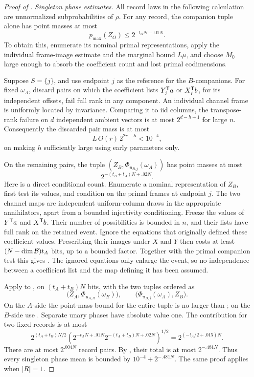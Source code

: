 \begin{proof}[Proof of ]
\medskip\noindent
\emph{Singleton phase estimates.}
All record laws in the following calculation are unnormalized
subprobabilities of \(\rho\).  For any record, the companion
tuple alone has point masses at most
\begin{equation}
 p_{\max}(Z_O)\le2^{-t_ON+.01N}.
 \label{eq:companion-pmax}
\end{equation}
To obtain this, enumerate its nominal primal representations,
apply the individual frame-image estimate and the marginal
bound \(L\mu\), and choose \(M_0\) large enough to absorb the
coefficient count and lost primal codimensions.

Suppose \(S=\{j\}\), and use endpoint \(j\) as the reference
for the \(B\)-companions.  For fixed \(\omega_A\), discard
pairs on which the coefficient lists
\(Y_j^{\mathsf T} a\) or \(X_j^{\mathsf T} b\), for its independent offsets,
fail full rank in any component.  An individual channel frame
is uniformly located by invariance.  Comparing it to iid
columns, the transpose-rank failure on \(d\) independent
ambient vectors is at most \(2^{d-h+1}\) for large \(n\).
Consequently the discarded pair mass is at most
\[
 L\,O(r)\,2^{2r-h}<10^{-4},
\]
on making \(h\) sufficiently large using early parameters only.

On the remaining pairs, the tuple
\((Z_B,\Phi_{u_{B,j}}(\omega_A))\) has point masses at most
\begin{equation}
 2^{-(t_B+t_A)N+.02N}.
 \label{eq:singleton-joint-pmax}
\end{equation}
Here is a direct conditional count.  Enumerate a nominal
representation of \(Z_B\), first test its values, and condition
on the primal frames at endpoint \(j\).  The two channel maps
are independent uniform-column draws in the appropriate
annihilators, apart from a bounded injectivity conditioning.
Freeze the values of \(Y^{\mathsf T} a\) and \(X^{\mathsf T} b\).  Their
number of possibilities is bounded in \(n\), and their lists
have full rank on the retained event.  Ignore the equations
that originally defined these coefficient values.  Prescribing
their images under \(X\) and \(Y\) then costs at least
\((N-\dim\mathcal B)t_A\) bits, up to a bounded factor.
Together with the primal companion test this gives
.  The ignored equations only
enlarge the event, so no independence between a coefficient
list and the map defining it has been assumed.

Apply  to , on
\((t_A+t_B)N\) bits, with the two tuples ordered as
\[
 \bigl(Z_A,\Phi_{u_{A,R}}(\omega_B)\bigr),
 \qquad
 \bigl(\Phi_{u_{B,j}}(\omega_A),Z_B\bigr).
\]
On the \(A\)-side the point-mass bound for the entire tuple is no
larger than
; on the \(B\)-side use
.  Separate unary phases have
absolute value one.  The contribution for two fixed records is
at most
\[
 2^{(t_A+t_B)N/2}
 \left(2^{-t_AN+.01N}
       2^{-(t_A+t_B)N+.02N}\right)^{1/2}
 =2^{(-t_A/2+.015)N}.
 \]
There are at most \(2^{.004N}\) record pairs.  By
, their total is at most \(2^{-.481N}\).
Thus every singleton phase mean is bounded by
\(10^{-4}+2^{-.481N}\).  The same proof applies when
\(|R|=1\).


\end{proof}
